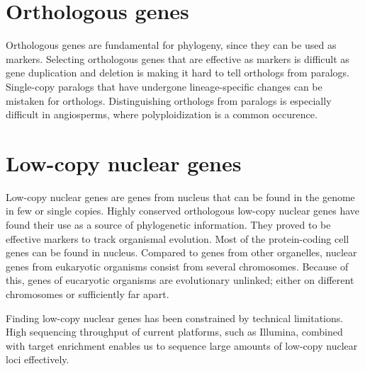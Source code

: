 \section{Orthologous genes}
Orthologous genes are fundamental for phylogeny, since they can be used as markers. Selecting orthologous genes that are effective as markers 
is difficult as gene duplication and deletion is making it hard to tell orthologs from paralogs. Single-copy paralogs that have 
undergone lineage-specific changes can be mistaken for orthologs. 
\cite {wang2014identification}
Distinguishing orthologs from paralogs is especially difficult in angiosperms, where polyploidization is a common occurence. 
\cite {zhang2012highly}

\section{Low-copy nuclear genes}
Low-copy nuclear genes are genes from nucleus that can be found in the genome in few or single copies. 
Highly conserved orthologous low-copy nuclear genes have found their use as a source of phylogenetic information. They proved to be effective markers to 
track organismal evolution. 
\cite {zhang2012highly}
Most of the protein-coding cell genes can be found in nucleus. Compared to genes from other organelles, nuclear genes from eukaryotic organisms consist 
from several chromosomes. Because of this, genes of eucaryotic organisms are evolutionary unlinked; either on different chromosomes or sufficiently far apart. 
\cite {wang2014identification}

Finding low-copy nuclear genes has been constrained by technical limitations. High sequencing throughput of current platforms, such as Illumina, combined with 
target enrichment enables us to sequence large amounts of low-copy nuclear loci effectively. 
\cite {sang2002utility}

